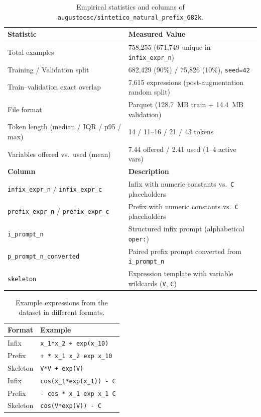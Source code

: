 \begin{table}[htbp]
    \centering
    \caption{Empirical statistics and columns of \texttt{augustocsc/sintetico\_natural\_prefix\_682k}.}
    \label{tab:dataset_stats}
    \begin{tabular}{ll}
    \toprule
    \textbf{Statistic} & \textbf{Measured Value} \\
    \midrule
    Total examples & 758{,}255 (671{,}749 unique in \texttt{infix\_expr\_n}) \\
    Training / Validation split & 682{,}429 (90\%) / 75{,}826 (10\%), \texttt{seed=42} \\
    Train--validation exact overlap & 7{,}615 expressions (post-augmentation random split) \\
    File format & Parquet (128.7~MB train + 14.4~MB validation) \\
    Token length (median / IQR / p95 / max) & 14 / 11--16 / 21 / 43 tokens \\
    Variables offered vs.\ used (mean) & 7.44 offered / 2.41 used (1--4 active vars) \\
    \midrule
    \textbf{Column} & \textbf{Description} \\
    \midrule
    \texttt{infix\_expr\_n} / \texttt{infix\_expr\_c} & Infix with numeric constants vs.\ \texttt{C} placeholders \\
    \texttt{prefix\_expr\_n} / \texttt{prefix\_expr\_c} & Prefix with numeric constants vs.\ \texttt{C} placeholders \\
    \texttt{i\_prompt\_n} & Structured infix prompt (alphabetical \texttt{oper:}) \\
    \texttt{p\_prompt\_n\_converted} & Paired prefix prompt converted from \texttt{i\_prompt\_n} \\
    \texttt{skeleton} & Expression template with variable wildcards (\texttt{V}, \texttt{C}) \\
    \bottomrule
    \end{tabular}
\end{table}

\begin{table}[htbp]
    \centering
    \caption{Example expressions from the dataset in different formats.}
    \label{tab:dataset_examples}
    \begin{tabular}{p{2.5cm}p{10cm}}
    \toprule
    \textbf{Format} & \textbf{Example} \\
    \midrule
    Infix & \texttt{x\_1*x\_2 + exp(x\_10)} \\
    Prefix & \texttt{+ * x\_1 x\_2 exp x\_10} \\
    Skeleton & \texttt{V*V + exp(V)} \\
    \midrule
    Infix & \texttt{cos(x\_1*exp(x\_1)) - C} \\
    Prefix & \texttt{- cos * x\_1 exp x\_1 C} \\
    Skeleton & \texttt{cos(V*exp(V)) - C} \\
    \bottomrule
    \end{tabular}
\end{table}

